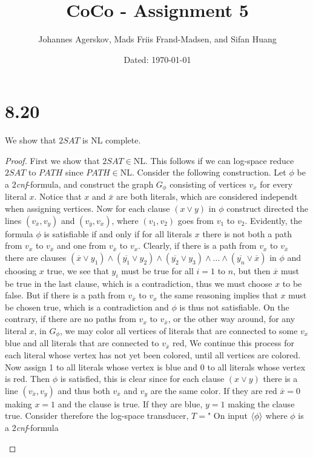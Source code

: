 \documentclass[a4paper,11pt]{article}
\author{Johannes Agerskov, Mads Friis Frand-Madsen, and Sifan Huang}
\date{Dated: \today}
\title{CoCo - Assignment 5}
\numberwithin{equation}{section}
\begin{document}
	
	\maketitle
		\section*{8.20}
		We show that $ 2SAT $ is NL complete.
		\begin{proof}
			First we show that $ 2SAT\in \text{NL} $. This follows if we can log-space reduce $ 2SAT $ to $ PATH $ since $PATH\in \text{NL}$. Consider the following construction. Let $ \phi $ be a $ 2 $\textit{cnf}-formula, and construct the graph $ G_\phi $ consisting of vertices $ v_x $ for every literal $ x $. Notice that $ x $ and $ \bar{x} $ are both literals, which are considered independt when assigning vertices. Now for each clause $ (x\vee y) $ in $ \phi $ construct directed the lines $ (v_{\overline{x}},v_y) $ and $ (v_{\overline{y}},v_x) $, where $ (v_1,v_2) $ goes from $ v_1 $ to $ v_2 $. Evidently, the formula $ \phi $ is satisfiable if and only if for all literals $ x $ there is not both a path from $ v_x $ to $ v_{\overline{x}} $ and one from $ v_{\overline{x}}  $ to $ v_x $. Clearly, if there is a path from $ v_x $ to $ v_{\overline{x}} $ there are clauses $ (\overline{x}\vee y_1)\wedge(\overline{y_1}\vee y_2)\wedge(\overline{y_2}\vee y_3)\wedge...\wedge(\overline{y_n}\vee \overline{x}) $ in $\phi$ and choosing $ x $ true, we see that $ y_i $ must be true for all $ i=1 $ to $ n $, but then $ \overline{x} $ must be true in the last clause, which is a contradiction, thus we must choose $ x $ to be false. But if there is a path from $ v_{\overline{x}} $ to $ v_x $ the same reasoning implies that $ x $ must be chosen true, which is a contradiction and $ \phi $ is thus not satisfiable. On the contrary, if there are no paths from $ v_x $ to $ v_{\overline{x}} $, or the other way around, for any literal $ x $, in $ G_\phi $, we may color all vertices of literals that are connected to some $ v_x $ blue and all literals that are connected to $ v_{\overline{x}} $ red, We continue this process for each literal whose vertex has not yet been colored, until all vertices are colored. Now assign 1 to all literals whose vertex is blue and 0 to all literals whose vertex is red. Then $ \phi $ is satisfied, this is clear since for each clause $ (x\vee y) $ there is a line $ (v_{\overline{x}},v_y) $ and thus both $ v_{\overline{x}} $ and $ v_y $ are the same color. If they are red $ \overline{x}=0 $ making $ x=1 $ and the clause is true. If they are blue, $ y=1 $ making the clause true. Consider therefore the log-space transducer, $ T= $" On input $ \braket{\phi} $ where $ \phi $ is a 2\textit{cnf}-formula\begin{enumerate}

\end{enumerate}
\end{proof}
\end{document}
